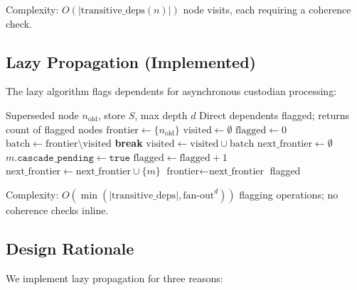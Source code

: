 \documentclass[11pt,letterpaper]{article}
\begin{document}
Complexity: $O(|\text{transitive\_deps}(n)|)$ node visits, each requiring a coherence check.

\subsection{Lazy Propagation (Implemented)}

The lazy algorithm flags dependents for asynchronous custodian processing:

\begin{algorithm}[H]
\caption{LazyPropagate: Flag dependents for custodian re-evaluation}
\label{alg:lazy}
\begin{algorithmic}[1]
\Require Superseded node $n_{\text{old}}$, store $S$, max depth $d$
\Ensure Direct dependents flagged; returns count of flagged nodes
\State $\text{frontier} \gets \{n_{\text{old}}\}$
\State $\text{visited} \gets \emptyset$
\State $\text{flagged} \gets 0$
    \State $\text{batch} \gets \text{frontier} \setminus \text{visited}$
     \textbf{break} \EndIf
    \State $\text{visited} \gets \text{visited} \cup \text{batch}$
    \State $\text{next\_frontier} \gets \emptyset$
            \State $m.\texttt{cascade\_pending} \gets \texttt{true}$
            \State $\text{flagged} \gets \text{flagged} + 1$
            \State $\text{next\_frontier} \gets \text{next\_frontier} \cup \{m\}$
        \EndIf
    \EndFor
    \State $\text{frontier} \gets \text{next\_frontier}$
\EndFor
\State \Return flagged
\end{algorithmic}
\end{algorithm}

Complexity: $O(\min(|\text{transitive\_deps}|, \text{fan-out}^d))$ flagging operations; no coherence checks inline.

\subsection{Design Rationale}

We implement lazy propagation for three reasons:
\end{document}
